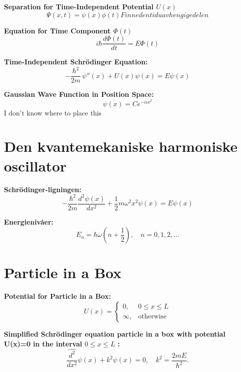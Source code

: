 \documentclass[a4paper,11pt]{article}
\renewcommand{\textbf}[1]{{\scriptsize	\bfseries #1}}
\begin{document}
\begin{footnotesize}
\begin{multicols}{2}
\begin{minipage}{\linewidth}
\textbf{Separation for Time-Independent Potential $U(x)$}
\[
    \Psi(x,t) = \psi(x) \phi(t)
    Finne den tiduavhengige delen 
\]

\end{minipage}
\begin{minipage}{\linewidth}

\textbf{Equation for Time Component $\Phi(t)$}
\[
    i \hbar \frac{d \Phi(t)}{dt} = E \Phi(t) 
\]

\end{minipage}
\begin{minipage}{\linewidth}
\textbf{Time-Independent Schrödinger Equation:}
\[
-\frac{\hbar^2 }{2m} \,\psi''(x) + U(x)\psi(x) = E\psi(x)
\]

\end{minipage}
\begin{minipage}{\linewidth}

\textbf{Gaussian Wave Function in Position Space:} \\[-0.2cm]
\[
\psi(x) = Ce^{-\alpha x^2}
\]
I don't know where to place this
\end{minipage}

\section*{Den kvantemekaniske harmoniske oscillator}

\textbf{Schrödinger-ligningen:}
\[
-\frac{\hbar^2}{2m} \frac{d^2 \psi(x)}{dx^2} + \frac{1}{2} m \omega^2 x^2 \psi(x) = E \psi(x)
\]

\textbf{Energienivåer:}
\[
E_n = \hbar \omega \left( n + \frac{1}{2} \right), \quad n = 0, 1, 2, \dots
\]


\section*{Particle in a Box}


\begin{minipage}{\linewidth}
\textbf{Potential for Particle in a Box:}
\[
U(x) =
\begin{cases}
0, & 0 \leq x \leq L \\
\infty, & \text{otherwise}
\end{cases}
\]
\end{minipage}
\begin{minipage}{\linewidth}
\textbf{Simplified Schrödinger equation particle in a box with potential U(x)=0 in the interval $0 \leq x \leq L$ :}
\[
\hat{\frac{d^2}{dx^2}}\psi(x) + k^2\psi(x) = 0, \quad k^2 = \frac{2mE}{\hbar^2}.
\]
\end{minipage}




\end{multicols}
\end{footnotesize}
\end{document}
